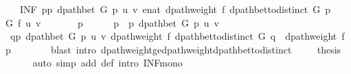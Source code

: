 \begin{isabellebody}
\ \ \ {\isachardoublequoteopen}{\isacharparenleft}{\kern0pt}INF\ p{\isasymin}{\isacharbraceleft}{\kern0pt}p{\isachardot}{\kern0pt}\ dpath{\isacharunderscore}{\kern0pt}bet\ G\ p\ u\ v{\isacharbraceright}{\kern0pt}{\isachardot}{\kern0pt}\ enat\ {\isacharparenleft}{\kern0pt}dpath{\isacharunderscore}{\kern0pt}weight\ f\ {\isacharparenleft}{\kern0pt}dpath{\isacharunderscore}{\kern0pt}bet{\isacharunderscore}{\kern0pt}to{\isacharunderscore}{\kern0pt}distinct\ G\ p{\isacharparenright}{\kern0pt}{\isacharparenright}{\kern0pt}{\isacharparenright}{\kern0pt}\ {\isasymle}\ {\isasymdelta}\ G\ f\ u\ v{\isachardoublequoteclose}%
\endisataginvisible
{\isafoldinvisible}%
%
\isadeliminvisible
\isanewline
%
\endisadeliminvisible
%
\isadelimproof
%
\endisadelimproof
%
\isatagproof
{}\isamarkupfalse%
\ {\isacharminus}{\kern0pt}\isanewline
\ \ \isacommand{{\isacharbraceleft}{\kern0pt}}\isamarkupfalse%
\ \isamarkupfalse%
\ p\isanewline
\ \ \ \ \isamarkupfalse%
\ {\isachardoublequoteopen}p\ {\isasymin}\ {\isacharbraceleft}{\kern0pt}p{\isachardot}{\kern0pt}\ dpath{\isacharunderscore}{\kern0pt}bet\ G\ p\ u\ v{\isacharbraceright}{\kern0pt}{\isachardoublequoteclose}\isanewline
\ \ \ \ \isamarkupfalse%
\ {\isachardoublequoteopen}{\isasymexists}q{\isasymin}{\isacharbraceleft}{\kern0pt}p{\isachardot}{\kern0pt}\ dpath{\isacharunderscore}{\kern0pt}bet\ G\ p\ u\ v{\isacharbraceright}{\kern0pt}{\isachardot}{\kern0pt}\ dpath{\isacharunderscore}{\kern0pt}weight\ f\ {\isacharparenleft}{\kern0pt}dpath{\isacharunderscore}{\kern0pt}bet{\isacharunderscore}{\kern0pt}to{\isacharunderscore}{\kern0pt}distinct\ G\ q{\isacharparenright}{\kern0pt}\ {\isasymle}\ dpath{\isacharunderscore}{\kern0pt}weight\ f\ p{\isachardoublequoteclose}\isanewline
\ \ \ \ \ \ \isamarkupfalse%
\ {\isacharparenleft}{\kern0pt}blast\ intro{\isacharcolon}{\kern0pt}\ dpath{\isacharunderscore}{\kern0pt}weight{\isacharunderscore}{\kern0pt}ge{\isacharunderscore}{\kern0pt}dpath{\isacharunderscore}{\kern0pt}weight{\isacharunderscore}{\kern0pt}dpath{\isacharunderscore}{\kern0pt}bet{\isacharunderscore}{\kern0pt}to{\isacharunderscore}{\kern0pt}distinct{\isacharparenright}{\kern0pt}\ \isacommand{{\isacharbraceright}{\kern0pt}}\isamarkupfalse%
\isanewline
\ \ \isamarkupfalse%
\ {\isacharquery}{\kern0pt}thesis\isanewline
\ \ \ \ \isamarkupfalse%
\ {\isacharparenleft}{\kern0pt}auto\ simp\ add{\isacharcolon}{\kern0pt}\ {\isasymdelta}{\isacharunderscore}{\kern0pt}def\ intro{\isacharcolon}{\kern0pt}\ INF{\isacharunderscore}{\kern0pt}mono{\isacharparenright}{\kern0pt}\isanewline

\end{isabellebody}
